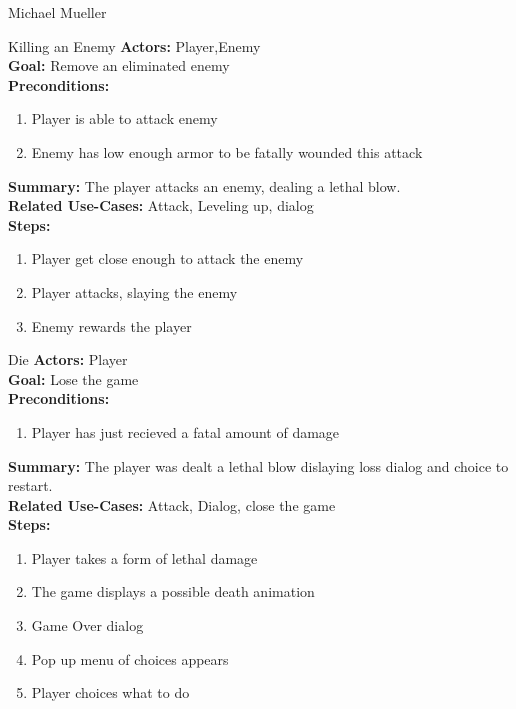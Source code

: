 \documentclass[12pt]{report}
\begin{document}
\begin{section}{Michael Mueller}
\begin{subsection}{Killing an Enemy}
\textbf{Actors:} Player,Enemy \\
\textbf{Goal:} Remove an eliminated enemy \\
\textbf{Preconditions:}
\begin{enumerate}
       \item Player is able to attack enemy
       \item Enemy has low enough armor to be fatally wounded this attack
\end{enumerate}
\textbf{Summary:} The player attacks an enemy, dealing a lethal blow. \\
\textbf{Related Use-Cases:} Attack, Leveling up, dialog \\
\textbf{Steps:}
\begin{enumerate}
	\item Player get close enough to attack the enemy
	\item Player attacks, slaying the enemy
	\item Enemy rewards the player
\end{enumerate}
\end{subsection}
\begin{subsection}{Die}
\textbf{Actors:} Player \\
\textbf{Goal:} Lose the game \\
\textbf{Preconditions:}
\begin{enumerate}
       \item Player has just recieved a fatal amount of damage
\end{enumerate}
\textbf{Summary:} The player was dealt a lethal blow dislaying loss dialog and choice to restart. \\
\textbf{Related Use-Cases:} Attack, Dialog, close the game \\
\textbf{Steps:}
\begin{enumerate}
	\item Player takes a form of lethal damage
	\item The game displays a possible death animation
	\item Game Over dialog
	\item Pop up menu of choices appears
	\item Player choices what to do
\end{enumerate}
\end{subsection}
\end{section}
\end{document}
